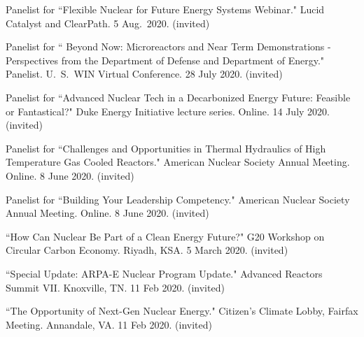 \begin{bibsection}

\item Panelist for ``Flexible Nuclear for Future Energy
Systems Webinar." Lucid Catalyst and ClearPath. 5 Aug.\ 2020. (invited) 

\item Panelist for `` Beyond Now: Microreactors and Near Term Demonstrations - Perspectives from
the Department of Defense and Department of Energy." Panelist. U.\ S.\ WIN Virtual
Conference. 28 July 2020. (invited) 

\item Panelist for ``Advanced Nuclear Tech in a Decarbonized Energy Future:
Feasible or Fantastical?" Duke Energy Initiative lecture series.
Online. 14 July 2020. (invited)


\item Panelist for ``Challenges and Opportunities in Thermal
Hydraulics of High Temperature Gas Cooled Reactors." American Nuclear Society Annual Meeting. Online. 8 June 2020. (invited)

\item Panelist for ``Building Your Leadership Competency."
American Nuclear Society Annual Meeting. Online. 8 June 2020. (invited)


\item ``How Can Nuclear Be Part of a Clean Energy Future?" G20
Workshop on Circular Carbon Economy. Riyadh, KSA. 5 March 2020. (invited)

\item ``Special Update: ARPA-E Nuclear Program Update." Advanced Reactors Summit VII. Knoxville, TN. 11 Feb 2020.
(invited)

\item ``The Opportunity of Next-Gen Nuclear Energy." Citizen's Climate Lobby, Fairfax Meeting. Annandale, VA. 11 Feb 2020. (invited)



\end{bibsection}
